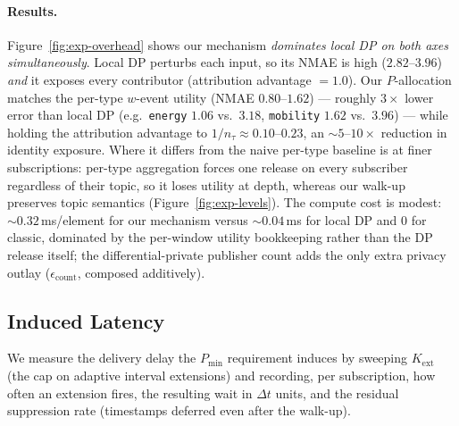 \paragraph{Results.} Figure~\ref{fig:exp-overhead} shows our mechanism \emph{dominates local DP on both axes simultaneously}. Local DP perturbs each input, so its NMAE is high ($2.82$--$3.96$) \emph{and} it exposes every contributor (attribution advantage $=1.0$). Our $P$-allocation matches the per-type $w$-event utility (NMAE $0.80$--$1.62$) --- roughly $3\times$ lower error than local DP (e.g.\ \texttt{energy} $1.06$ vs.\ $3.18$, \texttt{mobility} $1.62$ vs.\ $3.96$) --- while holding the attribution advantage to $1/n_\tau \approx 0.10$--$0.23$, an $\sim\!5$--$10\times$ reduction in identity exposure. Where it differs from the naive per-type baseline is at finer subscriptions: per-type aggregation forces one release on every subscriber regardless of their topic, so it loses utility at depth, whereas our walk-up preserves topic semantics (Figure~\ref{fig:exp-levels}). The compute cost is modest: $\sim\!0.32$\,ms/element for our mechanism versus $\sim\!0.04$\,ms for local DP and $0$ for classic, dominated by the per-window utility bookkeeping rather than the DP release itself; the differential-private publisher count adds the only extra privacy outlay ($\epsilon_{\text{count}}$, composed additively).

\subsection{Induced Latency}
\label{sec:latency}
We measure the delivery delay the $P_{\min}$ requirement induces by sweeping $K_{\text{ext}}$ (the cap on adaptive interval extensions) and recording, per subscription, how often an extension fires, the resulting wait in $\Delta t$ units, and the residual suppression rate (timestamps deferred even after the walk-up).


